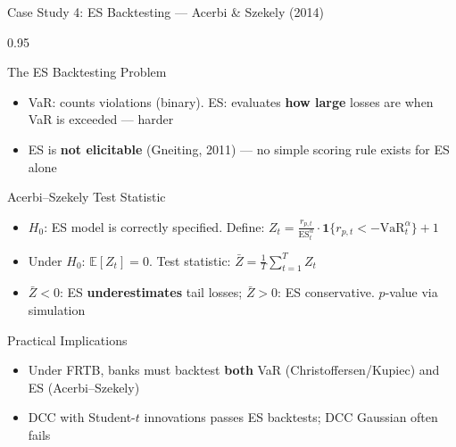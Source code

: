 \documentclass[9pt, aspectratio=169, t]{beamer}
\begin{document}
\begin{frame}{Case Study 4: ES Backtesting --- Acerbi \& Szekely (2014)}
    \begin{cminipage}{0.95\textwidth}
    \vspace{-3mm}
    {\scriptsize
    \begin{block}{The ES Backtesting Problem}
        \begin{itemize}\setlength{\itemsep}{0pt}
            \item VaR: counts violations (binary). ES: evaluates \textbf{how large} losses are when VaR is exceeded --- harder
            \item ES is \textbf{not elicitable} (Gneiting, 2011) --- no simple scoring rule exists for ES alone
        \end{itemize}
    \end{block}
    \vspace{-2mm}
    \begin{block}{Acerbi--Szekely Test Statistic}
        \begin{itemize}\setlength{\itemsep}{0pt}
            \item $H_0$: ES model is correctly specified. Define: $Z_t = \frac{r_{p,t}}{\text{ES}_t^\alpha}\cdot\mathbf{1}\{r_{p,t} < -\text{VaR}_t^\alpha\} + 1$
            \item Under $H_0$: $\mathbb{E}[Z_t] = 0$. Test statistic: $\bar{Z} = \frac{1}{T}\sum_{t=1}^T Z_t$
            \item $\bar{Z} < 0$: ES \textbf{underestimates} tail losses; $\bar{Z} > 0$: ES conservative. $p$-value via simulation
        \end{itemize}
    \end{block}
    \vspace{-2mm}
    \begin{alertblock}{Practical Implications}
        \begin{itemize}\setlength{\itemsep}{0pt}
            \item Under FRTB, banks must backtest \textbf{both} VaR (Christoffersen/Kupiec) and ES (Acerbi--Szekely)
            \item DCC with Student-$t$ innovations passes ES backtests; DCC Gaussian often fails
        \end{itemize}
    \end{alertblock}
    }
    \end{cminipage}
\end{frame}
\end{document}
